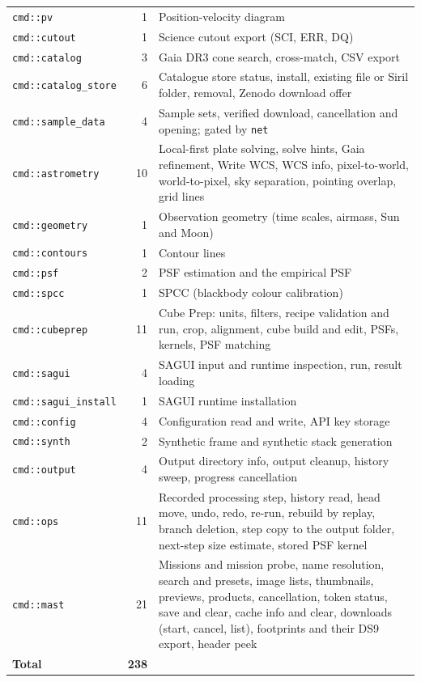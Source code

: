 \documentclass[11pt,a4paper]{article}
\newcommand{\code}[1]{\texttt{\small #1}}
\newcommand{\nCommands}{238}
\begin{document}
\begin{longtable}{lr>{\raggedright\arraybackslash}p{9.4cm}}
    \code{cmd::pv} & 1 & Position-velocity diagram \\
    \code{cmd::cutout} & 1 & Science cutout export (SCI, ERR, DQ) \\
    \code{cmd::catalog} & 3 & Gaia DR3 cone search, cross-match, CSV export \\
    \code{cmd::catalog\_store} & 6 & Catalogue store status, install, existing file or Siril folder, removal, Zenodo download offer \\
    \code{cmd::sample\_data} & 4 & Sample sets, verified download, cancellation and opening; gated by \code{net} \\
    \code{cmd::astrometry} & 10 & Local-first plate solving, solve hints, Gaia refinement, Write WCS, WCS info, pixel-to-world, world-to-pixel, sky separation, pointing overlap, grid lines \\
    \code{cmd::geometry} & 1 & Observation geometry (time scales, airmass, Sun and Moon) \\
    \code{cmd::contours} & 1 & Contour lines \\
    \code{cmd::psf} & 2 & PSF estimation and the empirical PSF \\
    \code{cmd::spcc} & 1 & SPCC (blackbody colour calibration) \\
    \code{cmd::cubeprep} & 11 & Cube Prep: units, filters, recipe validation and run, crop, alignment, cube build and edit, PSFs, kernels, PSF matching \\
    \code{cmd::sagui} & 4 & SAGUI input and runtime inspection, run, result loading \\
    \code{cmd::sagui\_install} & 1 & SAGUI runtime installation \\
    \code{cmd::config} & 4 & Configuration read and write, API key storage \\
    \code{cmd::synth} & 2 & Synthetic frame and synthetic stack generation \\
    \code{cmd::output} & 4 & Output directory info, output cleanup, history sweep, progress cancellation \\
    \code{cmd::ops} & 11 & Recorded processing step, history read, head move, undo, redo, re-run, rebuild by replay, branch deletion, step copy to the output folder, next-step size estimate, stored PSF kernel \\
    \code{cmd::mast} & 21 & Missions and mission probe, name resolution, search and presets, image lists, thumbnails, previews, products, cancellation, token status, save and clear, cache info and clear, downloads (start, cancel, list), footprints and their DS9 export, header peek \\
    \midrule
    \textbf{Total} & \textbf{\nCommands} & \\
    \end{longtable}
    \endgroup
\end{document}
